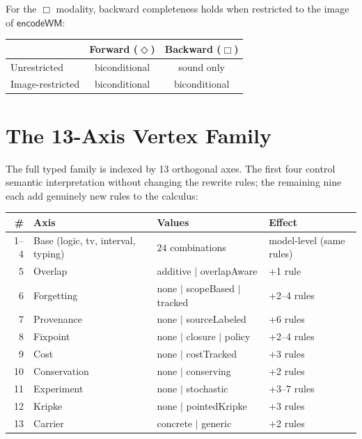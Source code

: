 \documentclass[11pt,openany]{report}
\begin{document}
For the $\Box$ modality, backward completeness holds when restricted
to the image of $\mathsf{encodeWM}$:

\begin{center}
\begin{tabular}{lcc}
\toprule
& Forward ($\Diamond$) & Backward ($\Box$) \\
\midrule
Unrestricted & biconditional & sound only \\
Image-restricted & biconditional & biconditional \\
\bottomrule
\end{tabular}
\end{center}


\section{The 13-Axis Vertex Family}
\label{sec:wm-13axis}

The full typed family is indexed by 13 orthogonal axes.  The first
four control semantic interpretation without changing the rewrite
rules; the remaining nine each add genuinely new rules to the
calculus:

\begin{center}
{\footnotesize
\begin{tabular}{rlll}
\toprule
\textbf{\#} & \textbf{Axis} & \textbf{Values} & \textbf{Effect} \\
\midrule
1--4 & Base (logic, tv, interval, typing)
     & $24$ combinations & model-level (same rules) \\
5 & Overlap & additive $|$ overlapAware & +1 rule \\
6 & Forgetting & none $|$ scopeBased $|$ tracked & +2--4 rules \\
7 & Provenance & none $|$ sourceLabeled & +6 rules \\
8 & Fixpoint & none $|$ closure $|$ policy & +2--4 rules \\
9 & Cost & none $|$ costTracked & +3 rules \\
10 & Conservation & none $|$ conserving & +2 rules \\
11 & Experiment & none $|$ stochastic & +3--7 rules \\
12 & Kripke & none $|$ pointedKripke & +3 rules \\
13 & Carrier & concrete $|$ generic & +2 rules \\
\bottomrule
\end{tabular}}
\end{center}
\end{document}
